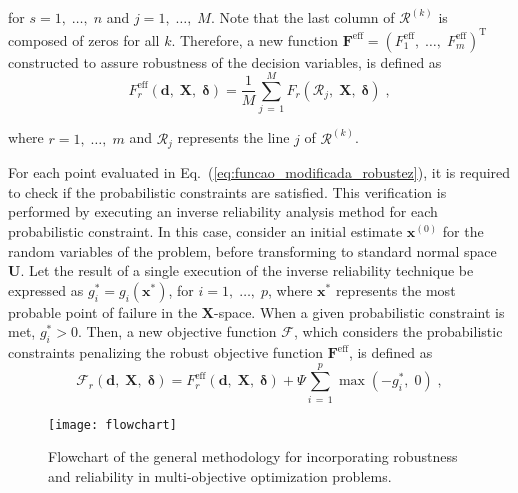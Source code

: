 \documentclass[final,5p,times,twocolumn,numbers]{elsarticle}
\newcommand{\vect}[1]{\mathbf{\boldsymbol{#1}}}
\begin{document}
\noindent for $ s = 1, \; \dots, \; n $ and $ j = 1, \; \dots, \; M $. Note that the last column of $ \vect{\mathcal{R}}^{\left( k \right)} $ is composed of zeros for all $ k $. Therefore, a new function $ \mathbf{F}^{\mathrm{eff}} = \left( F_{1}^{\mathrm{eff}}, \; \dots, \; F_{m}^{\mathrm{eff}} \right)^{\mathrm{T}} $ constructed to assure robustness of the decision variables, is defined as
%
\begin{equation} \label{eq:funcao_modificada_robustez}
F_{r}^{\mathrm{eff}} \left( \mathbf{d}, \; \mathbf{X}, \; \vect{\delta} \right) = \dfrac{1}{M} \sum\limits_{j \, = \, 1}^{M} F_{r} \left( \mathbf{\mathcal{R}}_{j}, \; \mathbf{X}, \; \vect{\delta} \right) \; ,
\end{equation}

\noindent where $ r = 1, \; \dots, \; m $ and $ \boldsymbol{\mathcal{R}}_{j} $ represents the line $ j $ of $ \vect{\mathcal{R}}^{\left( k \right)} $.

For each point evaluated in Eq.~(\ref{eq:funcao_modificada_robustez}), it is required to check if the probabilistic constraints are satisfied. This verification is performed by executing an inverse reliability analysis method for each probabilistic constraint. In this case, consider an initial estimate $ \mathbf{x}^{\left( 0 \right)} $ for the random variables of the problem, before transforming to standard normal space $ \mathbf{U} $. Let the result of a single execution of the inverse reliability technique be expressed as $ g_{i}^{*} = g_{i} \left( \mathbf{x}^{*} \right) $, for $ i = 1, \; \dots, \; p $, where $ \mathbf{x}^{*} $ represents the most probable point of failure in the $ \mathbf{X} $-space. When a given probabilistic constraint is met, $ g_{i}^{*} > 0 $. Then, a new objective function $ \mathbf{\mathcal{F}} $, which considers the probabilistic constraints penalizing the robust objective function $ \mathbf{F}^{\mathrm{eff}} $, is defined as
%
\begin{equation} \label{eq:mod_geral_rob_conf}
\mathcal{F}_{r} \left( \mathbf{d}, \; \mathbf{X}, \; \vect{\delta} \right) = F_{r}^{\mathrm{eff}} \left( \mathbf{d}, \; \mathbf{X}, \; \vect{\delta} \right) + \Psi \sum\limits_{i \, = \, 1}^{p} \max \left( -g_{i}^{*}, \; 0 \right) \; ,
\end{equation}

\begin{figure*}[!ht]
    \centering
    \texttt{[image: flowchart]}
    \caption{Flowchart of the general methodology for incorporating robustness and reliability in multi-objective optimization problems.}
    \label{fig:flowchart}
\end{figure*}
\end{document}
